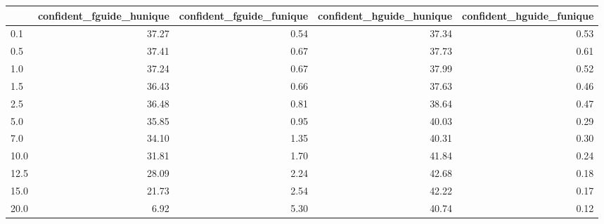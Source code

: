 \begin{tabular}{lrrrr}
\toprule
 & confident_fguide_hunique & confident_fguide_funique & confident_hguide_hunique & confident_hguide_funique \\
\midrule
0.1 & 37.27 & 0.54 & 37.34 & 0.53 \\
0.5 & 37.41 & 0.67 & 37.73 & 0.61 \\
1.0 & 37.24 & 0.67 & 37.99 & 0.52 \\
1.5 & 36.43 & 0.66 & 37.63 & 0.46 \\
2.5 & 36.48 & 0.81 & 38.64 & 0.47 \\
5.0 & 35.85 & 0.95 & 40.03 & 0.29 \\
7.0 & 34.10 & 1.35 & 40.31 & 0.30 \\
10.0 & 31.81 & 1.70 & 41.84 & 0.24 \\
12.5 & 28.09 & 2.24 & 42.68 & 0.18 \\
15.0 & 21.73 & 2.54 & 42.22 & 0.17 \\
20.0 & 6.92 & 5.30 & 40.74 & 0.12 \\
\bottomrule
\end{tabular}
